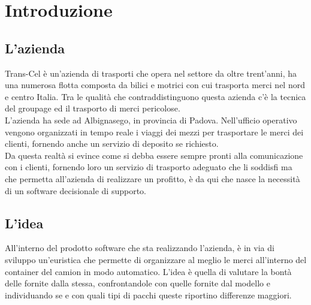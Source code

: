 
\chapter{Introduzione}
\section{L'azienda}
Trans-Cel è un'azienda di trasporti che opera nel settore da oltre trent'anni, ha una numerosa flotta composta da bilici e motrici con cui trasporta merci nel nord e centro Italia.
Tra le qualità che contraddistinguono questa azienda c'è la tecnica del groupage ed il trasporto di merci pericolose.\\
L'azienda ha sede ad Albignasego, in provincia di Padova. Nell'ufficio operativo vengono organizzati in tempo reale i viaggi dei mezzi per trasportare le merci dei clienti, fornendo anche un servizio di deposito se richiesto.\\
Da questa realtà si evince come si debba essere sempre pronti alla comunicazione con i clienti, fornendo loro un servizio di trasporto adeguato che li soddisfi ma che permetta all'azienda di realizzare un profitto, è da qui che nasce la necessità di un software decisionale di supporto.
\newpage
\section{L'idea}
All'interno del prodotto software che sta realizzando l'azienda, è in via di sviluppo un'euristica che permette di organizzare al meglio le merci all'interno del container del camion in modo automatico. L'idea è quella di valutare la bontà delle  fornite dalla stessa, confrontandole con quelle fornite dal modello e individuando se e con quali tipi di pacchi queste riportino differenze maggiori.

